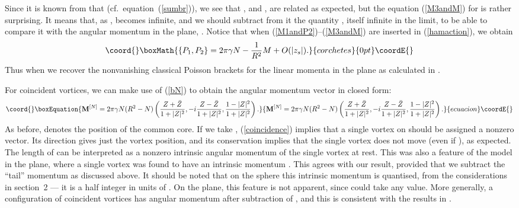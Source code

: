 \documentclass[a4paper,11pt]{article}
\begin{document}
Since it is known from \cite{Sam} that \coordHE{}
(cf.~equation~(\ref{sumbr})), we see
that \coordHE{}, \coordHE{} and \coordHE{}, \coordHE{} are related as 
expected, but the 
equation (\ref{M3andM}) for \coordHE{} is rather surprising. It means that, as 
\coordHE{}, 
\coordHE{} becomes infinite, and we should subtract from it
the quantity \coordHE{}, itself infinite in the limit, to be
able to compare it with the angular momentum in the plane, \coordHE{}.
Notice that when (\ref{M1andP2})--(\ref{M3andM}) are inserted in 
(\ref{hamaction}), we obtain
\[\coord{}\boxMath{
\{P_{1},P_{2}\}=2\pi\gamma N-\frac{1}{R^{2}}M+O(|z_{s}|).
}{corchetes}{0pt}\coordE{}\]
Thus when \coordHE{} we recover the nonvanishing
classical Poisson brackets for the linear momenta in the plane
as calculated in \cite{Hor}.


For \coordHE{} coincident vortices, we can make use of (\ref{bN}) to obtain the
angular momentum vector in closed form:
\begin{equation}\coord{}\boxEquation{\label{coincidence}
\mathbf{M}^{[N]}=2\pi\gamma N(R^{2}-N)
\left(   
\frac{Z+\bar{Z}}{1+|Z|^{2}},
-i\frac{Z-\bar{Z}}{1+|Z|^{2}},
\frac{1-|Z|^{2}}{1+|Z|^{2}}
\right).
}{\mathbf{M}^{[N]}=2\pi\gamma N(R^{2}-N)
\left(   
\frac{Z+\bar{Z}}{1+|Z|^{2}},
-i\frac{Z-\bar{Z}}{1+|Z|^{2}},
\frac{1-|Z|^{2}}{1+|Z|^{2}}
\right).
}{ecuacion}\coordE{}\end{equation}
As before, \coordHE{} denotes the position of the common core.
If we take \coordHE{}, (\ref{coincidence}) implies that
a single vortex on \myHighlight{$\Sigma$}\coordHE{} should be assigned a nonzero \coordHE{} 
vector. Its direction gives just the vortex position, and its conservation 
implies that the single vortex does not move (even if \coordHE{}), 
as expected. The length of \coordHE{} can be interpreted as a
nonzero intrinsic angular momentum of the single vortex at rest. This
was also a feature of the model in the plane, where a single vortex
was found to have an
intrinsic momentum \myHighlight{$-2\pi\gamma$}\coordHE{}. This agrees with our result, provided
that we subtract the ``tail'' momentum \coordHE{} as discussed
above. It should be noted that on the sphere this intrinsic momentum
is quantised, from the considerations in section~2 --- it is a half 
integer in units of \coordHE{}. On the
plane, this feature is not apparent, since \myHighlight{$\gamma$}\coordHE{} could take any
value. More generally, a configuration of \coordHE{} coincident vortices has
angular momentum \coordHE{} after subtraction of 
\coordHE{}, and this is consistent with the results in \cite{MNcl}.
\end{document}
